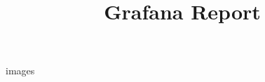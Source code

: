 \documentclass{article}
\begin{document}
\title{Grafana Report}
\author{}
\date{}

\maketitle

{{images}}
\end{document}
